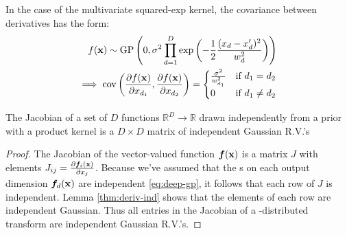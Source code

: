In the case of the multivariate squared-exp kernel, the covariance between derivatives has the form:
%
\begin{align}
f({\bf{x}}) \sim \textnormal{GP}\left( 0, 
\sigma^2 \prod_{d=1}^D \exp \left(-\frac{1}{2} \frac{(x_d - x_d')^2}{w_d^2} \right) \right) \nonumber \\
 \implies 
\operatorname{cov} \left( \frac{\partial f({\bf{x}})}{\partial x_{d_1}}, \frac{\partial f({\bf{x}})}{\partial x_{d_2}} \right) =
\begin{cases} 
\frac{\sigma^2}{w_{d_1}^2} & \mbox{if } d_1 = d_2 \\ 
0 & \mbox{if } d_1 \neq d_2 \end{cases}
\end{align}


\begin{lemma}
\label{thm:matrix}
The Jacobian of a set of $D$ functions $\mathbb{R}^D \rightarrow \mathbb{R}$ drawn independently from a \gp{} prior with a product kernel is a $D \times D$ matrix of independent Gaussian R.V.'s
\end{lemma}
%
\begin{proof}
The Jacobian of the vector-valued function $\boldsymbol{f}({\bf{x}})$ is a matrix $J$ with elements ${J_{ij} = \frac{ \partial \boldsymbol{f}_i ({\bf{x}}) }{\partial x_j}}$.
%
%
%
Because we've assumed that the \gp{}s on each output dimension $\boldsymbol{f}_d({\bf{x}})$ are independent \eqref{eq:deep-gp}, it follows that each row of $J$ is independent.
Lemma \ref{thm:deriv-ind} shows that the elements of each row are independent Gaussian.
Thus all entries in the Jacobian of a \gp{}-distributed transform are independent Gaussian R.V.'s.
\end{proof}



